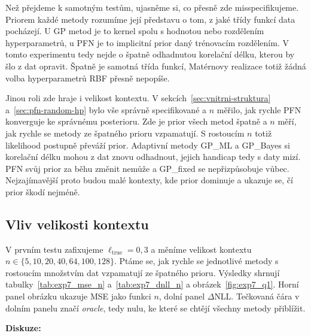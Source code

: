 Než přejdeme k samotným testům, ujasněme si, co přesně zde misspecifikujeme.
Priorem každé metody rozumíme její představu o tom, z jaké třídy funkcí data pocházejí.
U GP metod je to kernel spolu s hodnotou nebo rozdělením hyperparametrů, u PFN je to implicitní prior daný trénovacím rozdělením.
V tomto experimentu tedy nejde o špatně odhadnutou korelační délku, kterou by šlo z dat opravit.
Špatně je samotná třída funkcí, Matérnovy realizace totiž žádná volba hyperparametrů RBF přesně nepopíše.
\par

Jinou roli zde hraje i velikost kontextu.
V sekcích~\ref{sec:vnitrni-struktura} a~\ref{sec:pfn-random-hp} bylo vše správně specifikované a $n$ měřilo, jak rychle PFN konverguje ke správnému posterioru.
Zde je prior všech metod špatně a $n$ měří, jak rychle se metody ze špatného prioru vzpamatují.
S rostoucím $n$ totiž likelihood postupně převáží prior.
Adaptivní metody GP\_ML a GP\_Bayes si korelační délku mohou z dat znovu odhadnout, jejich handicap tedy s daty mizí.
PFN svůj prior za běhu změnit nemůže a GP\_fixed se nepřizpůsobuje vůbec.
Nejzajímavější proto budou malé kontexty, kde prior dominuje a ukazuje se, čí prior škodí nejméně.
\par

\subsection{Vliv velikosti kontextu}
\label{subsec:exp7-q1}

V prvním testu zafixujeme $\ell_{\text{true}} = 0{,}3$ a měníme velikost kontextu $n \in \{5, 10, 20, 40, 64, 100, 128\}$.
Ptáme se, jak rychle se jednotlivé metody s rostoucím množstvím dat vzpamatují ze špatného prioru.
Výsledky shrnují tabulky~\ref{tab:exp7_mse_n} a~\ref{tab:exp7_dnll_n} a obrázek~\ref{fig:exp7_q1}.
Horní panel obrázku ukazuje MSE jako funkci $n$, dolní panel $\Delta$NLL.
Tečkovaná čára v dolním panelu značí \emph{oracle}, tedy nulu, ke které se chtějí všechny metody přiblížit.
\par

\textbf{Diskuze:}

